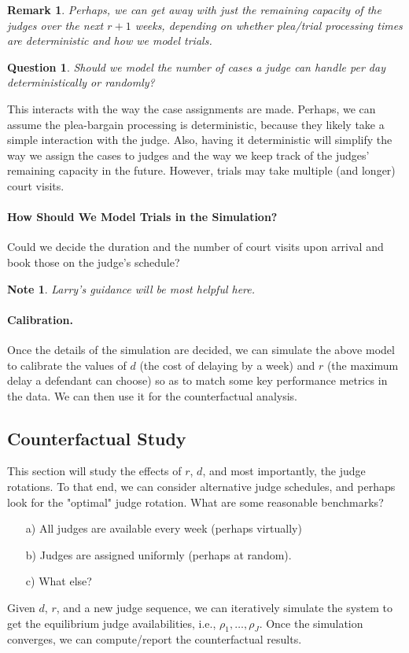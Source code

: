 \documentclass[11pt, oneside]{article}   	%
\theoremstyle{ModifiedStyle}
\newtheorem{remark}{Remark}
\newtheorem{question}{Question}
\newtheorem{note}{Note}
\begin{document}
\begin{remark}
	Perhaps, we can get away with just the remaining capacity of the judges over the next $r+1$ weeks, depending on whether plea/trial processing times are deterministic and how we model trials.
\end{remark}

\begin{question}
	Should we model the number of cases a judge can handle per day deterministically or randomly?
\end{question}
This interacts with the way the case assignments are made. Perhaps, we can assume the plea-bargain processing is deterministic, because they likely take a simple interaction with the judge. Also, having it deterministic will simplify the way we assign the cases to judges and the way we keep track of the judges' remaining capacity in the future. However, trials may take multiple (and longer) court visits.
%
\vspace{-3mm}
\paragraph{How Should We Model Trials in the Simulation?} Could we decide the duration and the number of court visits
upon arrival and book those on the judge's schedule?
%
\begin{note}
	Larry's guidance will be most helpful here.
\end{note}
%
\vspace{-3mm}
\paragraph{Calibration.} Once the details of the simulation are decided, we can simulate the above model to calibrate the values of $d$ (the cost of delaying by a week) and $r$ (the maximum delay a defendant can choose) so as to match some key performance metrics in the data. We can then use it for the counterfactual analysis.
%
\subsection{Counterfactual Study}
This section will study the effects of $r$, $d$, and most importantly, the judge rotations. To that end, we can consider alternative judge schedules, and perhaps look for the "optimal" judge rotation. What are some reasonable benchmarks?
\begin{itemize}
	\vspace{-3mm}
	\item[a)] All judges are available every week (perhaps virtually)
	\item[b)] Judges are assigned uniformly (perhaps at random).
	\item[c)] What else?
	\vspace{-3mm}
\end{itemize}
Given $d$, $r$, and a new judge sequence, we can iteratively simulate the system to get the equilibrium judge availabilities, i.e., $\rho_1,\ldots,\rho_J$. Once the simulation converges, we can compute/report the counterfactual results.
%
\vspace{-3mm}
\end{document}
